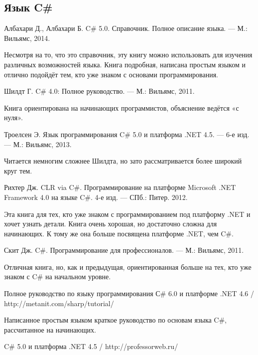 \begingroup
\renewcommand{\section}[2]{}%
\begin{thebibliography}{99}

  \subsection*{Язык C\#}

  Албахари Д., Албахари Б. C\# 5.0. Справочник. Полное описание языка. — М.: Вильямс, 2014.

  Несмотря на то, что это справочник, эту книгу можно использовать для
  изучения различных возможностей языка. Книга подробная, написана
  простым языком и отлично подойдёт тем, кто уже знаком с основами
  программирования.

  Шилдт Г. C\# 4.0: Полное руководство. — М.: Вильямс, 2011.

  Книга ориентирована на начинающих программистов, объяснение ведётся
  «с нуля».

  Троелсен Э. Язык программирования C\# 5.0 и платформа .NET 4.5. — 6-е изд. — М.: Вильямс, 2013.

  Читается немногим сложнее Шилдта, но зато рассматривается более
  широкий круг тем.
  
  Рихтер Дж. CLR via C\#. Программирование на платформе Microsoft .NET Framework 4.0 на языке C\#. 4-е изд. — СПб.: Питер. 2012.

  Эта книга для тех, кто уже знаком с программированием под платформу
  .NET и хочет узнать детали. Книга очень хорошая, но достаточно
  сложна для начинающих. К тому же она больше посвящена платформе
  .NET, чем C\#.

  Скит Дж. C\#. Программирование для профессионалов. — М.: Вильямс, 2011.

  Отличная книга, но, как и предыдущая, ориентированная больше на тех,
  кто уже знаком с C\# на начальном уровне.

  Полное руководство по языку программирования С\# 6.0 и платформе .NET 4.6 / http://metanit.com/sharp/tutorial/

  Написанное простым языком краткое руководство по основам языка C\#,
  рассчитанное на начинающих.

  C\# 5.0 и платформа .NET 4.5 / http://professorweb.ru/


\end{thebibliography}
